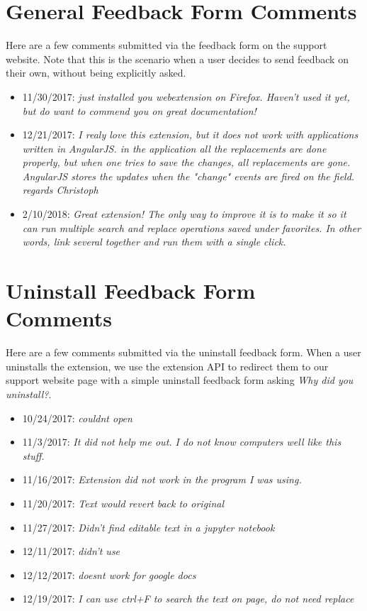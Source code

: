 \documentclass[bsc,frontabs,twoside,singlespacing,parskip,deptreport]{infthesis}
\begin{document}
\section{General Feedback Form Comments}
\label{section:general-feedback-form}
Here are a few comments submitted via the feedback form on the support website. Note that this is the scenario when a user decides to send feedback on their own, without being explicitly asked.
\begin{itemize}
\item
11/30/2017: \textit{just installed you webextension on Firefox. Haven't used it yet, but do want to commend you on great documentation!}
\item
12/21/2017: \textit{I realy love this extension, but it does not work with applications written in AngularJS. in the application all the replacements are done properly, but when one tries to save the changes, all replacements are gone. AngularJS stores the updates when the "change" events are fired on the field. regards Christoph}
\item
2/10/2018: \textit{Great extension!  The only way to improve it is to make it so it can run multiple search and replace operations saved under favorites. In other words, link several together and run them with a single click.}
\end{itemize}

\section{Uninstall Feedback Form Comments}
\label{section:uninstall-feedback-form}
Here are a few comments submitted via the uninstall feedback form. When a user uninstalls the extension, we use the extension API to redirect them to our support website page with a simple uninstall feedback form asking \textit{Why did you uninstall?}.
\begin{itemize}
\item
10/24/2017: \textit{couldnt open}
\item
11/3/2017: \textit{It did not help me out. I do not know computers well like this stuff.}
\item
11/16/2017: \textit{Extension did not work in the program I was using. }
\item
11/20/2017: \textit{Text would revert back to original}
\item
11/27/2017: \textit{Didn't find editable text in a jupyter notebook}
\item
12/11/2017: \textit{didn't use}
\item
12/12/2017: \textit{doesnt work for google docs}
\item
12/19/2017: \textit{I can use ctrl+F to search the text on page, do not need replace}
\end{itemize}



\end{document}
